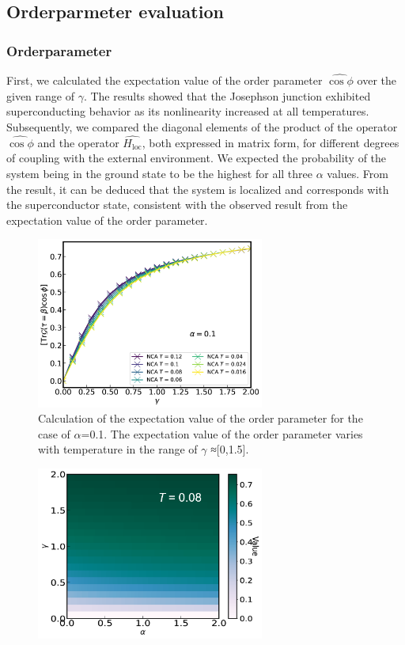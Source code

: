 \documentclass{article}[12pt]
\begin{document}
\begin{spacing}{1.5}
\subsection{Orderparmeter evaluation}
\subsubsection*{Orderparameter}
First, we calculated the expectation value of the order parameter $\hat{\cos\phi}$ 
over the given range of $\gamma$. The results showed that the Josephson junction exhibited superconducting behavior 
as its nonlinearity increased at all temperatures. Subsequently, we compared the diagonal elements of the product 
of the operator $\hat{\cos\phi}$ and the operator $\hat{H_{\text{loc}}}$, both expressed in matrix form, 
for different degrees of coupling with the external environment. We expected the probability of the system 
being in the ground state to be the highest for all three $\alpha$ values. From the result, 
it can be deduced that the system is localized and corresponds with the superconductor state, consistent with the observed
result from the expectation value of the order parameter.
\begin{figure}[htbp]
  \centerline{\includegraphics[width=7.5cm]{TexFigure/4/4_3_01_Expec_alp_0.1.png}}
  \caption{Calculation of the expectation value of the order parameter for the case of $\alpha$=0.1. 
  The expectation value of the order parameter varies with temperature in the range of $\gamma$ ≈[0,1.5].}
  \label{fig:Order1}
\end{figure}
\begin{figure}[htbp]
  \centerline{\includegraphics[width=7.5cm]{TexFigure/4/4_3_02_Temp.png}}

\end{figure}
\end{spacing}
\end{document}
